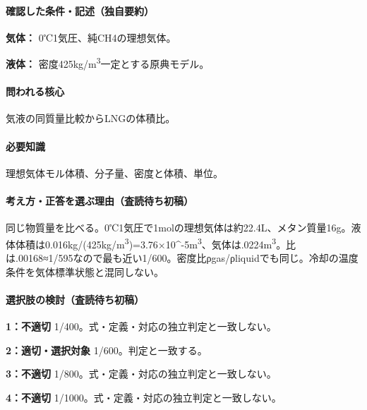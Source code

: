 \paragraph{確認した条件・記述（独自要約）}\mbox{}\par

\noindent\textbf{気体：} 0℃1気圧、純CH4の理想気体。\par

\noindent\textbf{液体：} 密度425kg/m\textsuperscript{3}一定とする原典モデル。\par

\paragraph{問われる核心} 気液の同質量比較からLNGの体積比。

\paragraph{必要知識} 理想気体モル体積、分子量、密度と体積、単位。

\paragraph{考え方・正答を選ぶ理由（査読待ち初稿）} 同じ物質量を比べる。0℃1気圧で1molの理想気体は約22.4L、メタン質量16g。液体体積は0.016kg/(425kg/m\textsuperscript{3})=\allowbreak{}3.76×10\textasciicircum{}-5m\textsuperscript{3}、気体は.0224m\textsuperscript{3}。比は.00168≈1/595なので最も近い1/600。密度比ρgas/ρliquidでも同じ。冷却の温度条件を気体標準状態と混同しない。

\paragraph{選択肢の検討（査読待ち初稿）}\mbox{}\par

\noindent\textbf{1：不適切} 1/400。式・定義・対応の独立判定と一致しない。\par

\noindent\textbf{2：適切・選択対象} 1/600。判定と一致する。\par

\noindent\textbf{3：不適切} 1/800。式・定義・対応の独立判定と一致しない。\par

\noindent\textbf{4：不適切} 1/1000。式・定義・対応の独立判定と一致しない。\par

